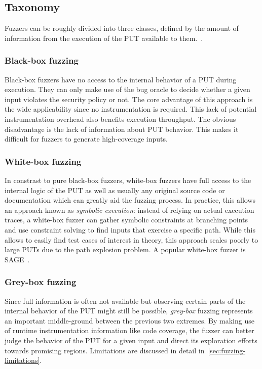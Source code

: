 
\subsection{Taxonomy\label{sec:fuzzing-taxonomy}}

Fuzzers can be roughly divided into three classes, defined by the amount of
information from the execution of the PUT available to them.~\cite{liang_fuzzing_2018}.

\subsubsection{Black-box fuzzing}

Black-box fuzzers have no access to the internal behavior of a PUT during execution.
They can only make use of the bug oracle to decide whether a given input violates
the security policy or not.
The core advantage of this approach is the wide applicability since no instrumentation
is required.
This lack of potential instrumentation overhead also benefits execution throughput.
The obvious disadvantage is the lack of information about PUT behavior.
This makes it difficult for fuzzers to generate high-coverage inputs.

\subsubsection{White-box fuzzing}

In constrast to pure black-box fuzzers, white-box fuzzers have full access to
the internal logic of the PUT as well as usually any original source code or
documentation which can greatly aid the fuzzing process.
In practice, this allows an approach known as \emph{symbolic execution}: instead
of relying on actual execution traces, a white-box fuzzer can gather symbolic
constraints at branching points and use constraint solving to find inputs that exercise
a specific path.
While this allows to easily find test cases of interest in theory, this approach scales poorly
to large PUTs due to the path explosion problem.
A popular white-box fuzzer is SAGE~\cite{godefroid_sage_2012}.

\subsubsection{Grey-box fuzzing}

Since full information is often not available but observing certain parts
of the internal behavior of the PUT might still be possible, \textit{grey-box}
fuzzing represents an important middle-ground between the previous two extremes.
By making use of runtime instrumentation information like code coverage, the fuzzer can
better judge the behavior of the PUT for a given input and direct its exploration efforts towards promising regions.
Limitations are discussed in detail in~\cref{sec:fuzzing-limitations}.

